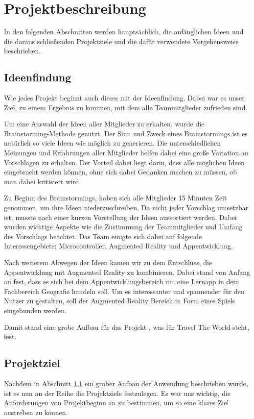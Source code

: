 \chapter{Projektbeschreibung}\label{ch:projektbeschreibung}
In den folgenden Abschnitten werden hauptsächlich, die anfänglichen Ideen und die daraus schließenden Projektziele und die dafür verwendete Vorgehensweise beschrieben.

\section{Ideenfindung}\label{ideenfindung}
Wie jedes Projekt beginnt auch dieses mit der Ideenfindung. Dabei war es unser Ziel, zu einem Ergebnis zu kommen, mit dem alle Teammitglieder zufrieden sind. 

Um eine Auswahl der Ideen aller Mitglieder zu erhalten, wurde die Brainstorming-Methode genutzt. Der Sinn und Zweck eines Brainstormings ist es natürlich so viele Ideen wie möglich zu generieren. Die unterschiedlichen Meinungen und Erfahrungen aller Mitglieder helfen dabei eine große Variation an Vorschlägen zu erhalten. Der Vorteil dabei liegt darin, dass alle möglichen Ideen eingebracht werden können, ohne sich dabei Gedanken machen zu müssen, ob man dabei kritisiert wird. 

Zu Beginn des Brainstormings, haben sich alle Mitglieder 15 Minuten Zeit genommen, um ihre Ideen niederzuschreiben. Da nicht jeder Vorschlag umsetzbar ist, musste nach einer kurzen Vorstellung der Ideen aussortiert werden. Dabei wurden wichtige Aspekte wie die Zustimmung der Teammitglieder und Umfang des Vorschlags beachtet. Das Team einigte sich dabei auf folgende Interessengebiete: Microcontroller, Augmented Reality und Appentwicklung.

Nach weiterem Abwegen der Ideen kamen wir zu dem Entschluss, die Appentwicklung mit Augmented Reality zu kombinieren. Dabei stand von Anfang an fest, dass es sich bei dem Appentwicklungsbereich um eine Lernapp in dem Fachbereich Geografie handeln soll. Um es interessanter und spannender für den Nutzer zu gestalten, soll der Augmented Reality Bereich in Form eines Spiels eingebunden werden. 

Damit stand eine grobe Aufbau für das Projekt  , was für Travel The World steht, fest.

\section{Projektziel}\label{projektziel}
Nachdem in Abschnitt \ref{ideenfindung} ein grober Aufbau der Anwendung beschrieben wurde, ist es nun an der Reihe die Projektziele festzulegen. Es war uns wichtig, die Anforderungen von Projektbeginn an zu bestimmen, um so eine klares Ziel anstreben zu können.


